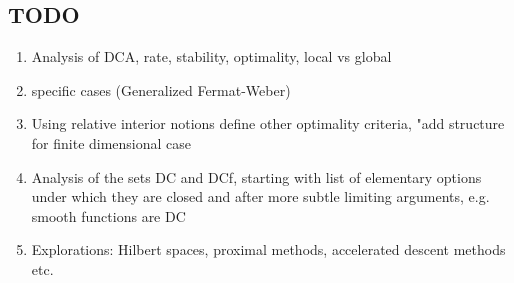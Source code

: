 
\subsection{TODO}
\begin{enumerate}
	\item Analysis of DCA, rate, stability, optimality, local vs global
	\item specific cases (Generalized Fermat-Weber)
	\item Using relative interior notions define other optimality
		criteria, "add structure for finite dimensional case
	\item Analysis of the sets DC and DCf, starting with list
		of elementary options under which they are closed 
		and after more subtle limiting arguments, e.g. smooth
		functions are DC
	\item Explorations: Hilbert spaces, proximal methods, accelerated 
		descent methods etc.
\end{enumerate}
